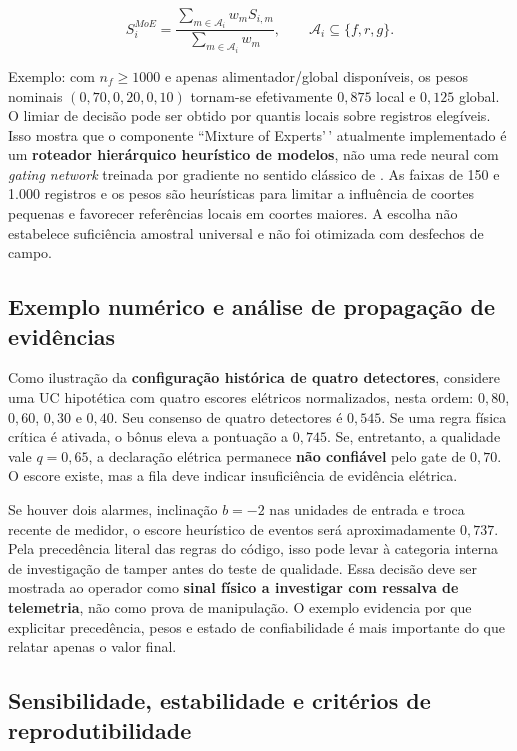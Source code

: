 \[S^{MoE}_i=\frac{\sum_{m\in\mathcal A_i}w_mS_{i,m}}{\sum_{m\in\mathcal A_i}w_m},\qquad \mathcal A_i\subseteq\{f,r,g\}.\]

Exemplo: com \(n_f\ge1000\) e apenas alimentador/global disponíveis, os pesos nominais \((0{,}70,0{,}20,0{,}10)\) tornam-se efetivamente \(0{,}875\) local e \(0{,}125\) global. O limiar de decisão pode ser obtido por quantis locais sobre registros elegíveis. Isso mostra que o componente ``Mixture of Experts'\,' atualmente implementado é um \textbf{roteador hierárquico heurístico de modelos}, não uma rede neural com \emph{gating network} treinada por gradiente no sentido clássico de \textcite{jacobs1991}. As faixas de 150 e 1.000 registros e os pesos são heurísticas para limitar a influência de coortes pequenas e favorecer referências locais em coortes maiores. A escolha não estabelece suficiência amostral universal e não foi otimizada com desfechos de campo.

\subsection{Exemplo numérico e análise de propagação de evidências}\label{exemplo-numuxe9rico-e-anuxe1lise-de-propagauxe7uxe3o-de-eviduxeancias}

Como ilustração da \textbf{configuração histórica de quatro detectores}, considere uma UC hipotética com quatro escores elétricos normalizados, nesta ordem: \(0{,}80\), \(0{,}60\), \(0{,}30\) e \(0{,}40\). Seu consenso de quatro detectores é \(0{,}545\). Se uma regra física crítica é ativada, o bônus eleva a pontuação a \(0{,}745\). Se, entretanto, a qualidade vale \(q=0{,}65\), a declaração elétrica permanece \textbf{não confiável} pelo gate de \(0{,}70\). O escore existe, mas a fila deve indicar insuficiência de evidência elétrica.

Se houver dois alarmes, inclinação \(b=-2\) nas unidades de entrada e troca recente de medidor, o escore heurístico de eventos será aproximadamente \(0{,}737\). Pela precedência literal das regras do código, isso pode levar à categoria interna de investigação de tamper antes do teste de qualidade. Essa decisão deve ser mostrada ao operador como \textbf{sinal físico a investigar com ressalva de telemetria}, não como prova de manipulação. O exemplo evidencia por que explicitar precedência, pesos e estado de confiabilidade é mais importante do que relatar apenas o valor final.

\subsection{Sensibilidade, estabilidade e critérios de reprodutibilidade}\label{sensibilidade-estabilidade-e-crituxe9rios-de-reprodutibilidade}

